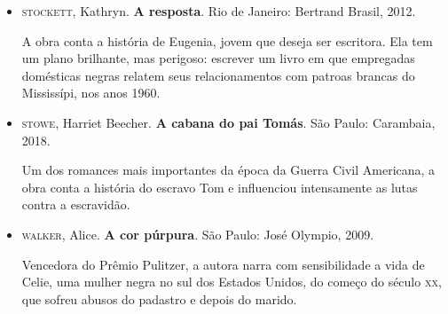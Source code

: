 \documentclass[11pt]{extarticle}
\begin{document}
\begin{itemize}
\item\textsc{stockett}, Kathryn. \textbf{A resposta}. Rio de Janeiro: Bertrand
  Brasil, 2012.

A obra conta a história de Eugenia, jovem que deseja ser escritora. Ela
tem um plano brilhante, mas perigoso: escrever um livro em que
empregadas domésticas negras relatem seus relacionamentos com patroas
brancas do Mississípi, nos anos 1960.

\item\textsc{stowe}, Harriet Beecher. \textbf{A cabana do pai Tomás}. São Paulo:
  Carambaia, 2018.

Um dos romances mais importantes da época da Guerra Civil Americana, a
obra conta a história do escravo Tom e influenciou intensamente as lutas
contra a escravidão.

\item\textsc{walker}, Alice. \textbf{A cor púrpura}. São Paulo: José Olympio, 2009.

Vencedora do Prêmio Pulitzer, a autora narra com sensibilidade a vida de
Celie, uma mulher negra no sul dos Estados Unidos, do começo do século
\textsc{xx}, que sofreu abusos do padastro e depois do marido.
\end{itemize}
\end{document}
